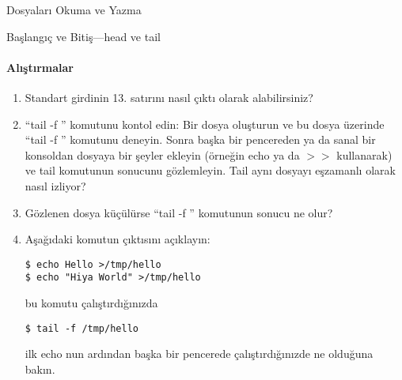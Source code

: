 \begin{section}{Dosyaları Okuma ve Yazma}
\begin{subsection}{Başlangıç ve Bitiş—head ve tail}
\paragraph{{\Huge{\PencilLeftDown}}Alıştırmalar}{
\begin{enumerate}
 \item Standart girdinin 13. satırını nasıl çıktı olarak alabilirsiniz?
 \item “tail -f ” komutunu kontol edin: Bir dosya oluşturun ve bu dosya üzerinde “tail -f ” komutunu deneyin. Sonra başka bir pencereden ya da sanal bir konsoldan dosyaya bir şeyler ekleyin (örneğin echo ya da $>>$ kullanarak) ve tail komutunun sonucunu gözlemleyin. Tail aynı dosyayı eşzamanlı olarak nasıl izliyor? 
\item Gözlenen dosya küçülürse “tail -f ” komutunun sonucu ne olur? 
\item Aşağıdaki komutun çıktısını açıklayın:
\begin{verbatim}
$ echo Hello >/tmp/hello 
$ echo "Hiya World" >/tmp/hello
\end{verbatim}
bu komutu çalıştırdığınızda
\begin{verbatim}
$ tail -f /tmp/hello
\end{verbatim}
ilk echo nun ardından başka bir pencerede çalıştırdığınızde ne olduğuna bakın.
\end{enumerate}}
\end{subsection}
\end{section}
